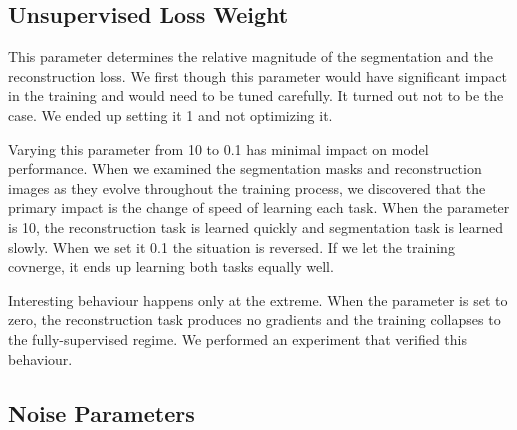\subsection{Unsupervised Loss Weight}
\label{sec:UnsupervisedLossWeight}

This parameter determines the relative magnitude of the segmentation and the reconstruction loss. We first though this parameter would have significant impact in the training and would need to be tuned carefully. It turned out not to be the case. We ended up setting it 1 and not optimizing it.

Varying this parameter from 10 to 0.1 has minimal impact on model performance. When we examined the segmentation masks and reconstruction images as they evolve throughout the training process, we discovered that the primary impact is the change of speed of learning each task. When the parameter is 10, the reconstruction task is learned quickly and segmentation task is learned slowly. When we set it 0.1 the situation is reversed. If we let the training covnerge, it ends up learning both tasks equally well.

Interesting behaviour happens only at the extreme. When the parameter is set to zero, the reconstruction task produces no gradients and the training collapses to the fully-supervised regime. We performed an experiment that verified this behaviour.


\subsection{Noise Parameters}
\label{sec:NoiseParameters}

